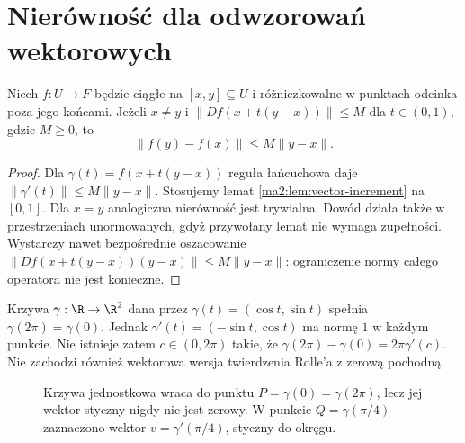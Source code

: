 \section{Nierówność dla odwzorowań wektorowych}

\begin{twierdzenie}
\label{ma2:thm:mean-value-inequality}
Niech $f:U\to F$ będzie ciągłe na $[x,y]\subseteq U$
i różniczkowalne w punktach odcinka poza jego końcami.
Jeżeli $x\ne y$ i $\|Df(x+t(y-x))\|\le M$ dla
$t\in(0,1)$, gdzie $M\ge0$, to
\[
 \|f(y)-f(x)\|\le M\|y-x\|.
\]
\end{twierdzenie}
\begin{proof}
Dla $\gamma(t)=f(x+t(y-x))$ reguła łańcuchowa daje
$\|\gamma'(t)\|\le M\|y-x\|$.
Stosujemy lemat \ref{ma2:lem:vector-increment}
na $[0,1]$. Dla $x=y$ analogiczna nierówność jest
trywialna. Dowód działa także w przestrzeniach
unormowanych, gdyż przywołany lemat nie wymaga
zupełności. Wystarczy nawet bezpośrednie oszacowanie
$\|Df(x+t(y-x))(y-x)\|\le M\|y-x\|$:
ograniczenie normy całego operatora nie jest konieczne.
\end{proof}

\begin{przyklad}
\label{ma2:ex:vector-mvt-failure}
Krzywa $\gamma:\R\to\R^2$ dana przez
$\gamma(t)=(\cos t,\sin t)$ spełnia
$\gamma(2\pi)=\gamma(0)$. Jednak
$\gamma'(t)=(-\sin t,\cos t)$ ma normę $1$ w każdym
punkcie. Nie istnieje zatem $c\in(0,2\pi)$ takie,
że $\gamma(2\pi)-\gamma(0)=2\pi\gamma'(c)$.
Nie zachodzi również wektorowa wersja twierdzenia
Rolle'a z zerową pochodną.
\end{przyklad}

\begin{figure}[htbp]
\centering
{}
\caption{Krzywa jednostkowa wraca do punktu $P=\gamma(0)=
\gamma(2\pi)$, lecz jej wektor styczny nigdy nie jest zerowy.
W punkcie $Q=\gamma(\pi/4)$ zaznaczono wektor
$v=\gamma'(\pi/4)$, styczny do okręgu.}
\label{ma2:fig:vector-mvt-failure}
\end{figure}
\FloatBarrier

